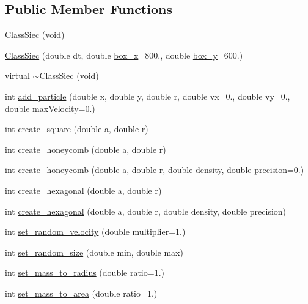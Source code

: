 \subsection*{Public Member Functions}
\begin{DoxyCompactItemize}
\item 
\mbox{\hyperlink{classClassSiec_ae87ded45ef76f08bf3116f3a933126a1}{Class\+Siec}} (void)
\item 
\mbox{\hyperlink{classClassSiec_a3a1c1350b50c564e85ff7371bff71777}{Class\+Siec}} (double dt, double \mbox{\hyperlink{classClassSiec_a8ebc9e2a0a8f7ccf4736482aa2a5f673}{box\+\_\+x}}=800., double \mbox{\hyperlink{classClassSiec_a51b98a4d58f22b84e410eaf2c7b31c4b}{box\+\_\+y}}=600.)
\item 
virtual \mbox{\hyperlink{classClassSiec_a0a4837ae00000cb4bc7a1f0deca000b5}{$\sim$\+Class\+Siec}} (void)
\item 
int \mbox{\hyperlink{classClassSiec_a6f31c5bea93923e8a83e810a1443e9d7}{add\+\_\+particle}} (double x, double y, double r, double vx=0., double vy=0., double max\+Velocity=0.)
\item 
int \mbox{\hyperlink{classClassSiec_a4b34a96c2302a69832378955e515349c}{create\+\_\+square}} (double a, double r)
\item 
int \mbox{\hyperlink{classClassSiec_a67d2e9b6ac5a7031d153336071fe0b1a}{create\+\_\+honeycomb}} (double a, double r)
\item 
int \mbox{\hyperlink{classClassSiec_a293f258a3a45122d0d59bd6b827f0442}{create\+\_\+honeycomb}} (double a, double r, double density, double precision=0.)
\item 
int \mbox{\hyperlink{classClassSiec_af9d21e3ef4441737d3c64271c5752532}{create\+\_\+hexagonal}} (double a, double r)
\item 
int \mbox{\hyperlink{classClassSiec_a89393fb8f724ede8d628e46018e692a3}{create\+\_\+hexagonal}} (double a, double r, double density, double precision)
\item 
int \mbox{\hyperlink{classClassSiec_a29968ccc2e9318ca89ae0b3dac4a390d}{set\+\_\+random\+\_\+velocity}} (double multiplier=1.)
\item 
int \mbox{\hyperlink{classClassSiec_a4b63c475330f7b0c96a244f55a624fac}{set\+\_\+random\+\_\+size}} (double min, double max)
\item 
int \mbox{\hyperlink{classClassSiec_a361b139e9734e15599847d2060d85d6b}{set\+\_\+mass\+\_\+to\+\_\+radius}} (double ratio=1.)
\item 
int \mbox{\hyperlink{classClassSiec_aa2eff85fe7fc842b2d0631118d533154}{set\+\_\+mass\+\_\+to\+\_\+area}} (double ratio=1.)

\end{DoxyCompactItemize}

